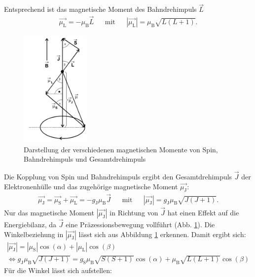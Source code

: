 Entsprechend ist das magnetische Moment des Bahndrehimpuls $\vec{L}$
\begin{align*}
  \vec{\mu_{\text{L}}} = - \mu_{\text{B}} \vec{L} && \text{mit} && |\vec{\mu_{\text{L}}}|= \mu_{\text{B}} \sqrt{L(L+1)}.
\end{align*}
\begin{figure}[h!]
  \centering
  \includegraphics[width=0.3\textwidth]{magmom1.png}
  \caption{Darstellung der verschiedenen magnetischen Momente von Spin, Bahndrehimpuls und Gesamtdrehimpuls \cite{1}}
  \label{fig:magmom}
\end{figure}
Die Kopplung von Spin und Bahndrehimpuls ergibt den Gesamtdrehimpuls $\vec{J}$ der Elektronenhülle und das zugehörige magnetische Moment $\vec{\mu_{\text{J}}}$:
\begin{align*}
  \vec{\mu_{\text{J}}} = \vec{\mu_{\text{S}}} + \vec{\mu_{\text{L}}}= - g_{\text{J}} \mu_{\text{B}} \vec{J} && \text{mit} && |\vec{\mu_{\text{J}}}|=  g_{\text{J}} \mu_{\text{B}} \sqrt{J(J+1)}.
\end{align*}
Nur das magnetische Moment $|\vec{\mu_{\text{J}}}|$ in Richtung von $\vec{J}$ hat einen Effekt auf die Energiebilanz, da $\vec{J}$ eine Präzessionsbewegung vollführt (Abb. \ref{fig:magmom}).
Die Winkelbeziehung in $|\vec{\mu_{\text{J}}}|$ lässt sich aus Abbildung \ref{fig:magmom} erkennen.
Damit ergibt sich:
\begin{align*}
                   |\vec{\mu_{\text{J}}}|                    =  |\mu_{\text{S}}| \cos{(\alpha)}                          + |\mu_{\text{L}}| \cos{(\beta)} \\
 \Leftrightarrow   g_{\text{J}} \mu_{\text{B}} \sqrt{J(J+1)} = g_{\text{S}} \mu_{\text{B}} \sqrt{S(S+1)} \cos{(\alpha)}  + \mu_{\text{B}} \sqrt{L(L+1)} \cos{(\beta)}
\end{align*}
Für die Winkel lässt sich aufstellen:
